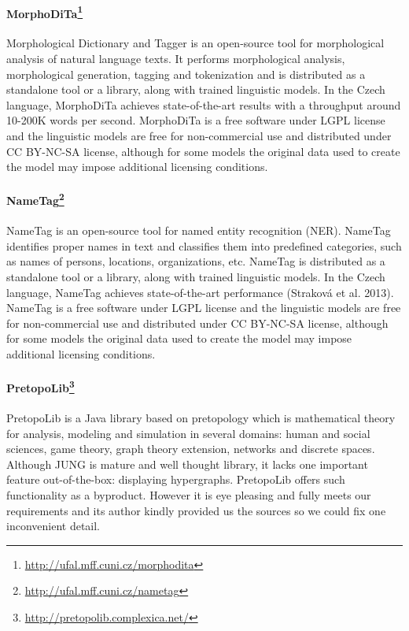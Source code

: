 \paragraph{MorphoDiTa\footnote{\url{http://ufal.mff.cuni.cz/morphodita}}}
Morphological Dictionary and Tagger is an open-source tool for morphological
analysis of natural language texts. It performs morphological analysis, 
morphological generation, tagging and tokenization and is distributed as
a standalone tool or a library, along with trained linguistic models. In
the Czech language, MorphoDiTa achieves state-of-the-art results with 
a throughput around 10-200K words per second. MorphoDiTa is a free software
under LGPL license and the linguistic models are free for non-commercial use
and distributed under CC BY-NC-SA license, although for some models the original
data used to create the model may impose additional licensing conditions.

\paragraph{NameTag\footnote{\url{http://ufal.mff.cuni.cz/nametag}}}
NameTag is an open-source tool for named entity recognition (NER). NameTag 
identifies proper names in text and classifies them into predefined categories,
such as names of persons, locations, organizations, etc. NameTag is distributed
as a standalone tool or a library, along with trained linguistic models.
In the Czech language, NameTag achieves state-of-the-art performance
(Straková et al. 2013). NameTag is a free software under LGPL license and the 
linguistic models are free for non-commercial use and distributed under CC 
BY-NC-SA license, although for some models the original data used to create
the model may impose additional licensing conditions.

\paragraph{PretopoLib\footnote{\url{http://pretopolib.complexica.net/}}}
PretopoLib is a Java library based on pretopology which is mathematical theory
for analysis, modeling and simulation in several domains: human and social
sciences, game theory, graph theory extension, networks and discrete spaces.
Although JUNG is mature and well thought library, it lacks one important feature
out-of-the-box: displaying hypergraphs. PretopoLib offers such functionality
as a byproduct. However it is eye pleasing and fully meets our requirements and
its author kindly provided us the sources so we could fix one inconvenient
detail.

